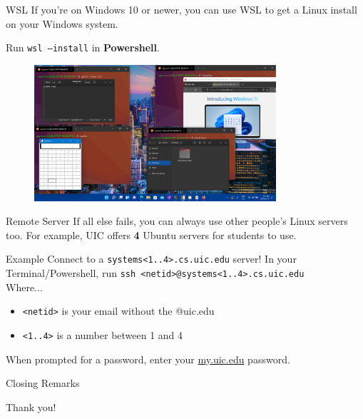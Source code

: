 \documentclass{beamer}
\begin{document}
\begin{frame}{WSL}
	If you're on Windows 10 or newer, you can use WSL to get a Linux
	install on your Windows system.

	Run \texttt{wsl --install} in \textbf{Powershell}.

	\begin{figure}
		\centering
		\includegraphics[width=0.8\textwidth]{wsl.png}
	\end{figure}
\end{frame}

\begin{frame}{Remote Server}
	If all else fails, you can always use other people's Linux servers too.
	For example, UIC offers \textbf{4} Ubuntu servers for students to use.
	\pause

	\begin{block}{Example}
		Connect to a \texttt{systems<1..4>.cs.uic.edu} server!
		In your Terminal/Powershell, run \texttt{ssh <netid>@systems<1..4>.cs.uic.edu}\\
		Where...
		\begin{itemize}
			\item \texttt{<netid>} is your email without the @uic.edu
			\item \texttt{<1..4>} is a number between 1 and 4
		\end{itemize}
		When prompted for a password, enter your \url{my.uic.edu} password.
	\end{block}
\end{frame}

\begin{frame}{Closing Remarks}
	\begin{center}
		\Huge Thank you!
	\end{center}
\end{frame}
\end{document}

